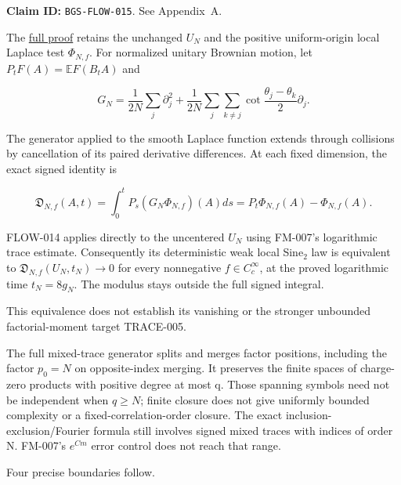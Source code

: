 \textbf{Claim ID:} \texttt{BGS-FLOW-015}. See Appendix~A.

\begin{theorem}\label{pass2:frontier-flow-015}

The
\href{https://github.com/ChurilovMaksim/BGS/blob/main/mathematics/microscopic_noise_removal.md}{full proof} retains the unchanged \(U_N\)
and the positive uniform-origin local Laplace test \(\Phi_{N,f}\).
For normalized unitary Brownian motion, let
\(P_tF(A)=\mathbb E F(B_tA)\) and

\[
G_N=\frac1{2N}\sum_j\partial_j^2+
\frac1{2N}\sum_j\sum_{k\ne j}
\cot\frac{\theta_j-\theta_k}{2}\partial_j.
\]

The generator applied to the smooth Laplace function extends through
collisions by cancellation of its paired derivative differences.
At each fixed dimension, the exact signed identity is

\[
\mathfrak D_{N,f}(A,t)=\int_0^tP_s(G_N\Phi_{N,f})(A)ds
=P_t\Phi_{N,f}(A)-\Phi_{N,f}(A).
\]

FLOW-014 applies directly to the uncentered \(U_N\) using FM-007's
logarithmic trace estimate. Consequently its deterministic weak local
Sine\(_2\) law is equivalent to \(\mathfrak D_{N,f}(U_N,t_N)\to0\)
for every nonnegative \(f\in C_c^\infty\), at the proved logarithmic time
\(t_N=8g_N\). The modulus stays outside the full signed integral.

\end{theorem}

This equivalence does not establish its vanishing or the stronger
unbounded factorial-moment target TRACE-005.

The full mixed-trace generator splits and merges factor positions,
including the factor \(p_0=N\) on opposite-index merging. It preserves
the finite spaces of charge-zero products with positive degree at most q.
Those spanning symbols need not be independent when \(q\ge N\);
finite closure does not give uniformly bounded complexity or a
fixed-correlation-order closure. The exact inclusion-exclusion/Fourier
formula still involves signed mixed traces with indices of order N.
FM-007's \(e^{Cm}\) error control does not reach that range.

Four precise boundaries follow.

